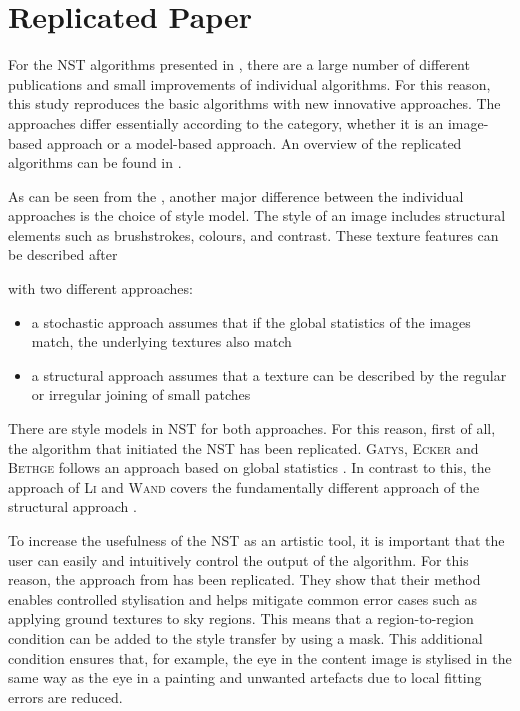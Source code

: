 \section{Replicated Paper} \label{sec:replicated_paper}
For the \gls{NST} algorithms presented in , there are a large number of different publications and small improvements of individual algorithms. For this reason, this study reproduces the basic algorithms with new innovative approaches. The approaches differ essentially according to the category, whether it is an image-based approach or a model-based approach. An overview of the replicated algorithms can be found in . 

As can be seen from the , another major difference between the individual approaches is the choice of style model. The style of an image includes structural elements such as brushstrokes, colours, and contrast. These texture features can be described after \author{Zhou} \cite{Zho2006} with two different approaches:
\begin{itemize}
	\item a stochastic approach assumes that if the global statistics of the images match, the underlying textures also match
	\item a structural approach assumes that a texture can be described by the regular or irregular joining of small patches
\end{itemize}

There are style models in \gls{NST} for both approaches. For this reason, first of all, the algorithm that initiated the \gls{NST} has been replicated. \textsc{Gatys}, \textsc{Ecker} and \textsc{Bethge} follows an approach based on global statistics \cite{GEB2016}. In contrast to this, the approach of \textsc{Li} and \textsc{Wand} covers the fundamentally different approach of the structural approach \cite{LW2016}. 

To increase the usefulness of the \gls{NST} as an artistic tool, it is important that the user can easily and intuitively control the output of the algorithm. For this reason, the approach from  \cite{GEB+2017} has been replicated. They show that their method enables controlled stylisation and helps mitigate common error cases such as applying ground textures to sky regions. This means that a region-to-region condition can be added to the style transfer by using a mask. This additional condition ensures that, for example, the eye in the content image is stylised in the same way as the eye in a painting and unwanted artefacts due to local fitting errors are reduced.

